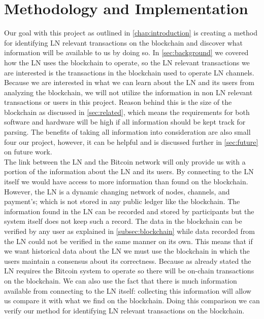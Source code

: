 \chapter{Methodology and Implementation}
\label{chap:metodology}

Our goal with this project as outlined in \cref{chap:introduction} is creating a method for identifying LN relevant transactions on the blockchain and discover what information will be available to us by doing so. In \cref{sec:background} we covered how the LN uses the blockchain to operate, so the LN relevant transactions we are interested is the transactions in the blockchain used to operate LN channels. Because we are interested in what we can learn about the LN and its users from analyzing the blockchain, we will not utilize the information in non LN relevant transactions or users in this project. Reason behind this is the size of the blockchain as discussed in \cref{sec:related}, which means the requirements for both software and hardware will be high if all information should be kept track for parsing. The benefits of taking all information into consideration are also small four our project, however, it can be helpful and is discussed further in \cref{sec:future} on future work. 
\\

The link between the LN and the Bitcoin network will only provide us with a portion of the information about the LN and its users. By connecting to the LN itself we would have access to more information than found on the blockchain. However, the LN is a dynamic changing network of nodes, channels, and payment's; which is not stored in any public ledger like the blockchain. The information found in the LN can be recorded and stored by participants but the system itself does not keep such a record. The data in the blockchain can be verified by any user as explained in \cref{subsec:blockchain} while data recorded from the LN could not be verified in the same manner on its own.
This means that if we want historical data about the LN we must use the blockchain in which the users maintain a consensus about its correctness. Because as already stated the LN requires the Bitcoin system to operate so there will be on-chain transactions on the blockchain. We can also use the fact that there is much information available from connecting to the LN itself: collecting this information will allow us compare it with what we find on the blockchain. Doing this comparison we can verify our method for identifying LN relevant transactions on the blockchain. 
\\

